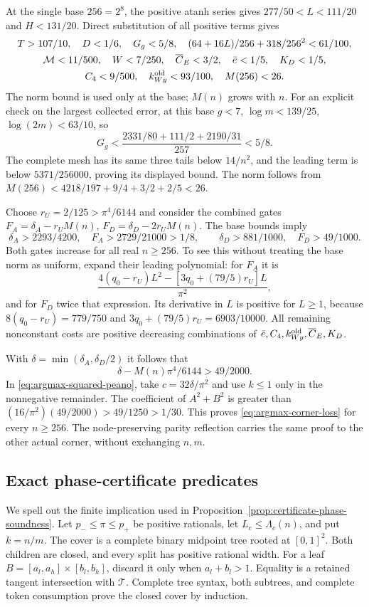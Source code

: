 At the single base $256=2^8$, the positive atanh series gives
$277/50<L<111/20$ and $H<131/20$.  Direct substitution of all
positive terms gives
\[
 \begin{gathered}
 T>107/10,\quad D<1/6,\quad G_g<5/8,\quad
 (64+16L)/256+318/256^2<61/100,\\
 \mathcal M<11/500,\quad W<7/250,\quad
 \overline C_E<3/2,\quad\bar e<1/5,\quad K_D<1/5,\\
 C_4<9/500,\quad k_{Wy}^{\rm old}<93/100,\quad M(256)<26.
 \end{gathered}
\]
The norm bound is used only at the base; $M(n)$ grows with $n$.
For an explicit check on the largest collected error, at this base
$g<7$, $\log m<139/25$, $\log(2m)<63/10$, so
\[
 G_g<\frac{2331/80+111/2+2190/31}{257}<5/8.
\]
The complete mesh has its same three tails below $14/n^2$, and the
leading term is below $5371/256000$, proving its displayed bound.
The norm follows from
$M(256)<4218/197+9/4+3/2+2/5<26$.

Choose $r_U=2/125>\pi^4/6144$ and consider the combined gates
$F_A=\delta_A-r_UM(n)$, $F_D=\delta_D-2r_UM(n)$.
The base bounds imply
\[
 \delta_A>2293/4200,\quad F_A>2729/21000>1/8,
 \qquad \delta_D>881/1000,\quad F_D>49/1000.
\]
Both gates increase for all real $n\geq256$.  To see this without
treating the base norm as uniform, expand their leading polynomial:
for $F_A$ it is
\[
 \frac{4(q_0-r_U)L^2-[3q_0+(79/5)r_U]L}{\pi^2},
\]
and for $F_D$ twice that expression.  Its derivative in $L$ is
positive for $L\geq1$, because $8(q_0-r_U)=779/750$ and
$3q_0+(79/5)r_U=6903/10000$.  All remaining nonconstant costs are
positive decreasing combinations of
$\bar e,C_4,k_{Wy}^{\rm old},\overline C_E,K_D$.

With $\delta=\min(\delta_A,\delta_D/2)$ it follows that
\[
 \delta-M(n)\pi^4/6144>49/2000.
\]
In \eqref{eq:argmax-squared-peano}, take $c=32\delta/\pi^2$ and
use $k\leq1$ only in the nonnegative remainder.  The coefficient of
$A^2+B^2$ is greater than
$(16/\pi^2)(49/2000)>49/1250>1/30$.
This proves \eqref{eq:argmax-corner-loss} for every $n\geq256$.
The node-preserving parity reflection carries the same proof to the
other actual corner, without exchanging $n,m$.

\subsection{Exact phase-certificate predicates}
\label{app:argmax-certificate-predicates}

We spell out the finite implication used in
Proposition~\ref{prop:certificate-phase-soundness}.  Let $p_-\leq\pi\leq p_+$
be positive rationals, let $L_c\leq\Lambda_c(n)$, and put $k=n/m$.
The cover is a complete binary midpoint tree rooted at $[0,1]^2$.
Both children are closed, and every split has positive rational width.
For a leaf $B=[a_l,a_h]\times[b_l,b_h]$, discard it only when
$a_l+b_l>1$.  Equality is a retained tangent intersection with
$\mathcal T$.  Complete tree syntax, both subtrees, and complete token
consumption prove the closed cover by induction.

